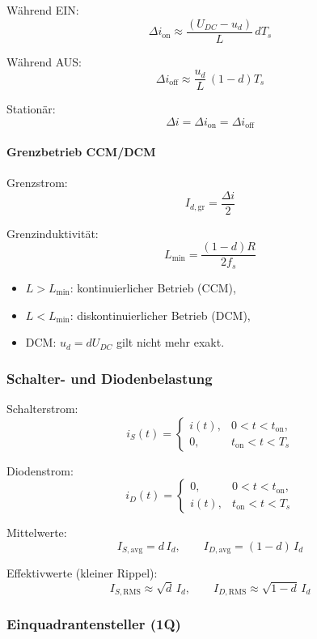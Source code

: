 Während EIN:
\[
\boxed{
\Delta i_{\mathrm{on}}\approx\frac{(U_{DC}-u_d)}{L}\,dT_s
}
\]

Während AUS:
\[
\boxed{
\Delta i_{\mathrm{off}}\approx\frac{u_d}{L}\,(1-d)T_s
}
\]

Stationär:
\[
\boxed{\Delta i=\Delta i_{\mathrm{on}}=\Delta i_{\mathrm{off}}}
\]

\paragraph{Grenzbetrieb CCM/DCM}

Grenzstrom:
\[
\boxed{I_{d,\mathrm{gr}}=\frac{\Delta i}{2}}
\]

Grenzinduktivität:
\[
\boxed{
L_{\min}=\frac{(1-d)R}{2f_s}
}
\]

\begin{itemize}
\item $L>L_{\min}$: kontinuierlicher Betrieb (CCM),
\item $L<L_{\min}$: diskontinuierlicher Betrieb (DCM),
\item DCM: $u_d=dU_{DC}$ gilt nicht mehr exakt.
\end{itemize}

\subsubsection{Schalter- und Diodenbelastung}

Schalterstrom:
\[
i_S(t)=
\begin{cases}
i(t), & 0<t<t_{\mathrm{on}},\\
0, & t_{\mathrm{on}}<t<T_s
\end{cases}
\]

Diodenstrom:
\[
i_D(t)=
\begin{cases}
0, & 0<t<t_{\mathrm{on}},\\
i(t), & t_{\mathrm{on}}<t<T_s
\end{cases}
\]

Mittelwerte:
\[
\boxed{
I_{S,\mathrm{avg}}=d\,I_d,
\qquad
I_{D,\mathrm{avg}}=(1-d)\,I_d
}
\]

Effektivwerte (kleiner Rippel):
\[
\boxed{
I_{S,\mathrm{RMS}}\approx\sqrt{d}\,I_d,
\qquad
I_{D,\mathrm{RMS}}\approx\sqrt{1-d}\,I_d
}
\]

\subsubsection{Einquadrantensteller (1Q)}

